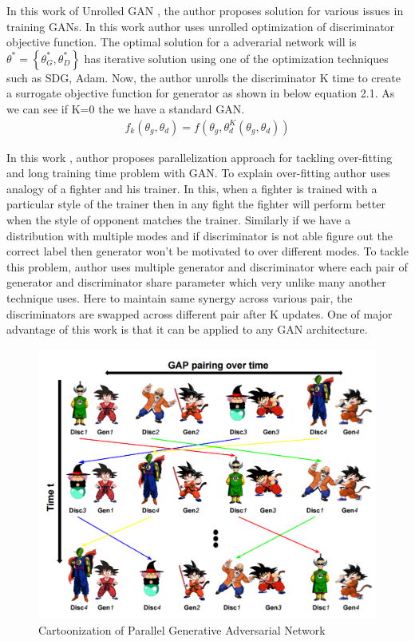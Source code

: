 In this work of Unrolled GAN \cite{unrolled-gan}, the author proposes solution for various issues in training GANs. In this work author uses unrolled optimization of discriminator objective function.  The optimal solution for a adverarial network will is $\theta^{*} =\left\{\theta^{*}_{G}, \theta^{*}_{D}\right\}$ has iterative solution using one of the optimization techniques such as SDG, Adam. Now, the author unrolls the discriminator K time to create a surrogate objective function for generator as shown in below equation 2.1. As we can see if K=0 the we have a standard GAN.
\begin{equation}
        \begin{aligned}
f_{k}{ \left( \theta _{g}, \theta _{d} \right) }=f \left( \theta _{g}, \theta _{d}^{K}{ \left( \theta _{g}, \theta _{d} \right) } \right)
\end{aligned}
\end{equation}

In this work \cite{1612.04021}, author proposes parallelization approach for tackling over-fitting and long training time problem with GAN. To explain over-fitting author uses analogy of a fighter and his trainer. In this, when a fighter is trained with a particular style of the trainer then in any fight the fighter will perform better when the style of opponent matches the trainer. Similarly if  we have a distribution with multiple modes and if discriminator is not able figure out the correct label then generator won't be motivated to over different modes. To tackle this problem, author uses multiple generator and discriminator where each pair of generator and discriminator share parameter which very unlike many another technique uses. Here to maintain same synergy across various pair, the discriminators are swapped across different pair after K updates.  One of major advantage of this work is that it can be applied to any GAN architecture.
\begin{figure}[H]
  \centering
    \includegraphics[scale=.3, angle=0]{Files/ParallelGAN.png}
    \caption{Cartoonization of Parallel Generative Adversarial Network}
    \label{fig:PGAN}
\end{figure}
